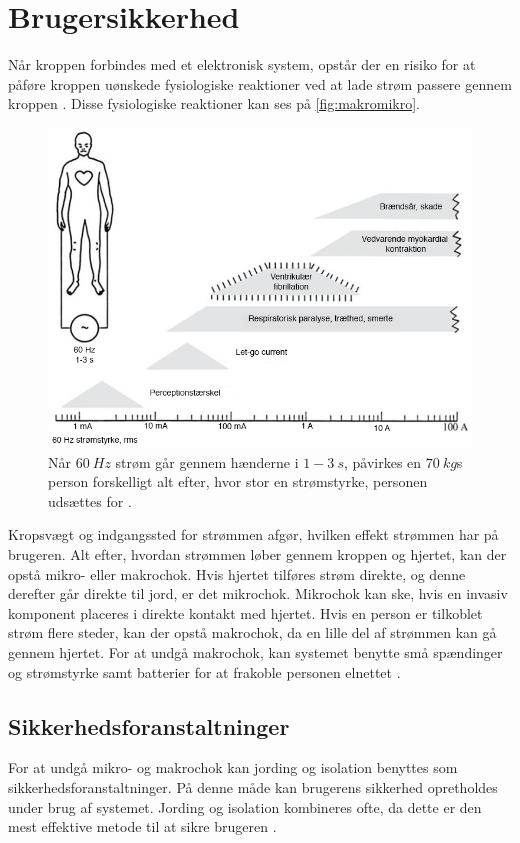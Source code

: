 \chapter{Brugersikkerhed} \label{sec:brugersikkerhed}
Når kroppen forbindes med et elektronisk system, opstår der en risiko for at påføre kroppen uønskede fysiologiske reaktioner ved at lade strøm passere gennem kroppen \citep{webster1998}. Disse fysiologiske reaktioner kan ses på \autoref{fig:makromikro}. 

\begin{figure}[H]
\centering
\includegraphics[width=1\textwidth]{figures/makromikro}
\caption{Når $60~Hz$ strøm går gennem hænderne i $1-3~s$, påvirkes en $70~kg$s person forskelligt alt efter, hvor stor en strømstyrke, personen udsættes for \citep{webster1998}.}
\label{fig:makromikro}
\end{figure}

\noindent
Kropsvægt og indgangssted for strømmen afgør, hvilken effekt strømmen har på brugeren. Alt efter, hvordan strømmen løber gennem kroppen og hjertet, kan der opstå mikro- eller makrochok. Hvis hjertet tilføres strøm direkte, og denne derefter går direkte til jord, er det mikrochok. Mikrochok kan ske, hvis en invasiv komponent placeres i direkte kontakt med hjertet. Hvis en person er tilkoblet strøm flere steder, kan der opstå makrochok, da en lille del af strømmen kan gå gennem hjertet. For at undgå makrochok, kan systemet benytte små spændinger og strømstyrke samt batterier for at frakoble personen elnettet \citep{webster1998}.

\section{Sikkerhedsforanstaltninger}
For at undgå mikro- og makrochok kan jording og isolation benyttes som sikkerhedsforanstaltninger. På denne måde kan brugerens sikkerhed opretholdes under brug af systemet. Jording og isolation kombineres ofte, da dette er den mest effektive metode til at sikre brugeren \citep{webster1998}.

